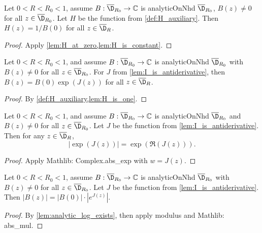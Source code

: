 \begin{lemma}[$H=1$]\label{lem:H_is_one}
\leanok
{}
Let $0<R<R_0<1$, assume $B:\overline{\D}_{R_0}\to\mathbb{C}$ is analyticOnNhd $\overline{\D}_{R_0}$, $B(z) \ne 0$ for all $z \in \overline{\D}_{R_0}$. Let $H$ be the function from \cref{def:H_auxiliary}. Then $H(z)=1/B(0)$ for all $z \in \overline{\D}_R$.
\end{lemma}
\begin{proof}
\leanok
Apply \cref{lem:H_at_zero,lem:H_is_constant}.
\end{proof}

\begin{lemma}\label{lem:analytic_log_exists}
\leanok
{}
Let $0<R<R_0<1$, and assume $B:\overline{\D}_{R_0}\to\mathbb{C}$ is analyticOnNhd $\overline{\D}_{R_0}$ with $B(z) \ne 0$ for all $z \in \overline{\D}_{R_0}$. For $J$ from \cref{lem:I_is_antiderivative}, then $B(z) = B(0)\exp(J(z))$ for all $z \in \overline{\D}_R$.
\end{lemma}
\begin{proof}
\leanok
By \cref{def:H_auxiliary,lem:H_is_one}.
\end{proof}


\begin{lemma}\label{lem:modulus_of_exp_I}
\leanok
{}
Let $0<R<R_0<1$, and assume $B:\overline{\D}_{R_0}\to\mathbb{C}$ is analyticOnNhd $\overline{\D}_{R_0}$ and $B(z) \ne 0$ for all $z \in \overline{\D}_{R_0}$. Let $J$ be the function from \cref{lem:I_is_antiderivative}. Then for any $z \in \overline{\D}_R$,
\[ |\exp(J(z))| = \exp(\Re(J(z))). \]
\end{lemma}
\begin{proof}
\leanok
Apply Mathlib: Complex.abs\_exp with $w = J(z)$.
\end{proof}


\begin{lemma}\label{lem:modulus_of_B_product_form}
\leanok
{}
Let $0<R<R_0<1$, assume $B:\overline{\D}_{R_0}\to\mathbb{C}$ is analyticOnNhd $\overline{\D}_{R_0}$ with $B(z) \ne 0$ for all $z \in \overline{\D}_{R_0}$. Let $J$ be the function from \cref{lem:I_is_antiderivative}. Then $|B(z)| = |B(0)| \cdot |e^{J(z)}|$.
\end{lemma}
\begin{proof}
\leanok
By \cref{lem:analytic_log_exists}, then apply modulus and Mathlib: abs\_mul.
\end{proof}

